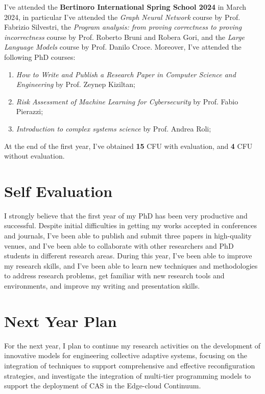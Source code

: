 \documentclass[runningheads]{llncs}
\begin{document}
I've attended the \textbf{Bertinoro International Spring School 2024} in March 2024,
in particular I've attended the \emph{Graph Neural Network} course by Prof. Fabrizio Silvestri,
the \emph{Program analysis: from proving correctness to proving incorrectness} course by Prof. Roberto Bruni and Robera Gori,
and the \emph{Large Language Models} course by Prof. Danilo Croce.
%
Moreover,
I've attended the following PhD courses:
\begin{enumerate}
    \item \emph{How to Write and Publish a Research Paper in Computer Science and Engineering} by Prof. Zeynep Kiziltan;
    \item \emph{Risk Assessment of Machine Learning for Cybersecurity} by Prof. Fabio Pierazzi;
    \item \emph{Introduction to complex systems science} by Prof. Andrea Roli;
\end{enumerate}
At the end of the first year,
I've obtained \textbf{15} CFU with evaluation, and \textbf{4} CFU without evaluation.

\section{Self Evaluation}

I strongly believe that the first year of my PhD has been very productive and successful.
%
Despite initial difficulties in getting my works accepted in conferences and journals,
I've been able to publish and submit three papers in high-quality venues,
and I've been able to collaborate with other researchers and PhD students in different research areas.
%
During this year,
I've been able to improve my research skills,
and I've been able to learn new techniques and methodologies to address research problems,
get familiar with new research tools and environments,
and improve my writing and presentation skills.

\section{Next Year Plan}

For the next year,
I plan to continue my research activities on the development of innovative models for engineering collective adaptive systems,
focusing on the integration of techniques to support comprehensive and effective reconfiguration strategies,
and investigate the integration of multi-tier programming models to support the deployment of CAS in the Edge-cloud Continuum.

%
%
%


\end{document}
